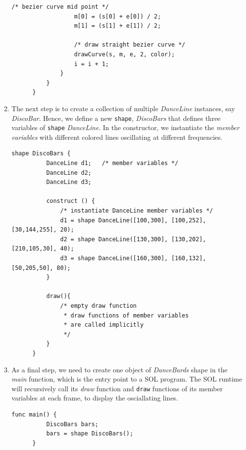 \documentclass[letterpaper,12pt]{report}
\begin{document}
\begin{enumerate}
\begin{lstlisting}[style=sol, aboveskip=1pt]
                  /* bezier curve mid point */            
                  m[0] = (s[0] + e[0]) / 2;
                  m[1] = (s[1] + e[1]) / 2;

                  /* draw straight bezier curve */
                  drawCurve(s, m, e, 2, color);
                  i = i + 1;
              }
          }
      }
    \end{lstlisting}

    \item The next step is to create a collection of multiple \textit{DanceLine} instances, say \textit{DiscoBar}. Hence, we define a new \texttt{shape}, \textit{DiscoBars} that defines three variables of \texttt{shape} \textit{DanceLine}. In the constructor, we instantiate the \textit{member variables} with different colored lines oscillating at different frequencies.\\

    \begin{lstlisting}[style=sol, aboveskip=1pt]
      shape DiscoBars {
          DanceLine d1;   /* member variables */
          DanceLine d2;
          DanceLine d3;

          construct () {
              /* instantiate DanceLine member variables */
              d1 = shape DanceLine([100,300], [100,252], [30,144,255], 20);
              d2 = shape DanceLine([130,300], [130,202], [210,105,30], 40);
              d3 = shape DanceLine([160,300], [160,132], [50,205,50], 80);
          }

          draw(){
              /* empty draw function 
               * draw functions of member variables
               * are called implicitly
               */
          }
      }
    \end{lstlisting}
  
    \item As a final step, we need to create one object of \textit{DanceBards} shape in the \textit{main} function, which is the entry point to a SOL program. The SOL runtime will recursively call its \textit{draw} function and \texttt{draw} functions of its member variables at each frame, to display the osciallating lines.\\

    \begin{lstlisting}[style=sol, aboveskip=1pt]
      func main() {
          DiscoBars bars;
          bars = shape DiscoBars();
      }
    \end{lstlisting}
  \end{enumerate}
\end{document}

